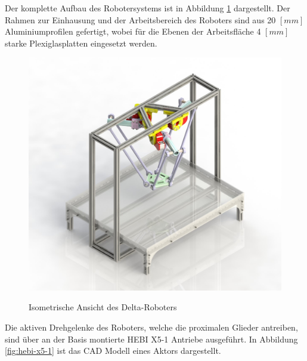 \documentclass[Bachelor, BMR, ngerman]{twbook}
\begin{document}
    \noindent
    Der komplette Aufbau des Robotersystems ist in Abbildung \ref{fig:delta-attached-isometric-view} dargestellt. Der Rahmen zur Einhausung und der Arbeitsbereich des Roboters sind aus 20 $[mm]$ Aluminiumprofilen gefertigt, wobei für die Ebenen der Arbeitsfläche 4 $[mm]$ starke Plexiglasplatten eingesetzt werden.
    \begin{figure}[H]
      \centering
      \fbox
      {
          \includegraphics[width=\linewidth]{delta-attached-isometric-view-rendered-1}
      }
      \caption[Isometrische Ansicht des Delta-Roboters]{Isometrische Ansicht des Delta-Roboters}
      \label{fig:delta-attached-isometric-view}
    \end{figure}
    \noindent
    Die aktiven Drehgelenke des Roboters, welche die proximalen Glieder antreiben, sind über an der Basis montierte HEBI X5-1 Antriebe ausgeführt. In Abbildung \ref{fig:hebi-x5-1} ist das CAD Modell eines Aktors dargestellt. 
\end{document}
